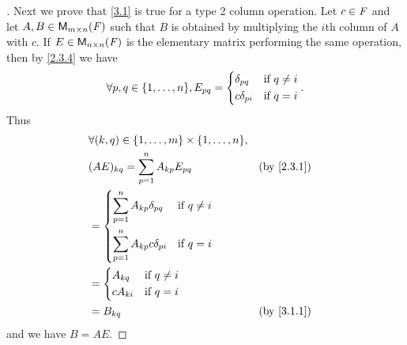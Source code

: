 \begin{proof}[]
  Next we prove that \cref{3.1} is true for a type 2 column operation.
  Let \(c \in \mathit{F}\) and let \(A, B \in \mathsf{M}_{{m} \times n}({\mathit{F}})\) such that \(B\) is obtained by multiplying the \(i\)th column of \(A\) with \(c\).
  If \(E \in \mathsf{M}_{{n} \times n}({\mathit{F}})\) is the elementary matrix performing the same operation, then by \cref{2.3.4} we have
  \[
    \forall p, q \in \set{1, \dots, n}, E_{p q} = \begin{dcases}
      \delta_{p q}   & \text{if } q \neq i \\
      c \delta_{p i} & \text{if } q = i
    \end{dcases}.
  \]
  Thus
  \begin{align*}
     & \forall (k, q) \in \set{1, \dots, m} \times \set{1, \dots, n},                               \\
     & (AE)_{k q} = \sum_{p = 1}^n A_{k p} E_{p q}                    &  & \text{(by \cref{2.3.1})} \\
     & = \begin{dcases}
           \sum_{p = 1}^n A_{k p} \delta_{p q}   & \text{if } q \neq i \\
           \sum_{p = 1}^n A_{k p} c \delta_{p i} & \text{if } q = i
         \end{dcases}                                \\
     & = \begin{dcases}
           A_{k q}   & \text{if } q \neq i \\
           c A_{k i} & \text{if } q = i
         \end{dcases}                                                            \\
     & = B_{k q}                                                      &  & \text{(by \cref{3.1.1})}
  \end{align*}
  and we have \(B = AE\).


\end{proof}
